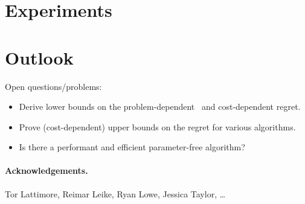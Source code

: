 \documentclass[a4paper]{article}
\begin{document}
\section{Experiments}

\iffalse
Algorithms:
* vanilla DMED (with commitment when 1 arm is selected?)
* partial monitoring algorithm (?)
* optimal stopping time (optimized problem-dependent)
* heuristic (with optimized alpha)

Problems:
* medium query cost c = 2 (>> gap)
  * horizon n = 10k vs gap 0.1 (< n^2/3)
  * horizon n = 1k vs gap 0.1 (~ n^2/3)
  * horizon n = 10k vs gap 0.01 (don't identify the arms)
* high query cost c = 50
  * horizon n = 10k vs gap 0.3 (pay to identify)
  * horizon n = 10k vs gap 0.1 (borderline case)
  * horizon n = 10k vs gap 0.05 (do not pay to identify)
* low query cost c = 0.01 (c << gap)
  * horizon n = 10k vs gap 0.1 (should almost always find the best arm)
  * horizon n = 200 vs gap 0.1 (query all the way?)
\fi


\section{Outlook}

Open questions/problems:
\begin{itemize}
\item Derive lower bounds on the problem-dependent~\citep[Thm.~2.2]{Bubeck12}
    and cost-dependent regret.
\item Prove (cost-dependent) upper bounds
    on the regret for various algorithms.
\item Is there a performant and efficient parameter-free algorithm?
\end{itemize}


\paragraph{Acknowledgements.}
Tor Lattimore, Reimar Leike, Ryan Lowe, Jessica Taylor, \dots


\end{document}
